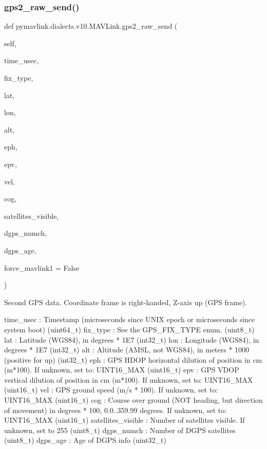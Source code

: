 \begin{DoxyVerb}
\begin{DoxyVerb}
\subsubsection{\texorpdfstring{gps2\+\_\+raw\+\_\+send()}{gps2\_raw\_send()}}
{\footnotesize\ttfamily def pymavlink.\+dialects.\+v10.\+M\+A\+V\+Link.\+gps2\+\_\+raw\+\_\+send (\begin{DoxyParamCaption}\item[{}]{self,  }\item[{}]{time\+\_\+usec,  }\item[{}]{fix\+\_\+type,  }\item[{}]{lat,  }\item[{}]{lon,  }\item[{}]{alt,  }\item[{}]{eph,  }\item[{}]{epv,  }\item[{}]{vel,  }\item[{}]{cog,  }\item[{}]{satellites\+\_\+visible,  }\item[{}]{dgps\+\_\+numch,  }\item[{}]{dgps\+\_\+age,  }\item[{}]{force\+\_\+mavlink1 = {\ttfamily False} }\end{DoxyParamCaption})}

\begin{DoxyVerb}Second GPS data. Coordinate frame is right-handed, Z-axis up (GPS
frame).

time_usec                 : Timestamp (microseconds since UNIX epoch or microseconds since system boot) (uint64_t)
fix_type                  : See the GPS_FIX_TYPE enum. (uint8_t)
lat                       : Latitude (WGS84), in degrees * 1E7 (int32_t)
lon                       : Longitude (WGS84), in degrees * 1E7 (int32_t)
alt                       : Altitude (AMSL, not WGS84), in meters * 1000 (positive for up) (int32_t)
eph                       : GPS HDOP horizontal dilution of position in cm (m*100). If unknown, set to: UINT16_MAX (uint16_t)
epv                       : GPS VDOP vertical dilution of position in cm (m*100). If unknown, set to: UINT16_MAX (uint16_t)
vel                       : GPS ground speed (m/s * 100). If unknown, set to: UINT16_MAX (uint16_t)
cog                       : Course over ground (NOT heading, but direction of movement) in degrees * 100, 0.0..359.99 degrees. If unknown, set to: UINT16_MAX (uint16_t)
satellites_visible        : Number of satellites visible. If unknown, set to 255 (uint8_t)
dgps_numch                : Number of DGPS satellites (uint8_t)
dgps_age                  : Age of DGPS info (uint32_t)\end{DoxyVerb}
 \mbox{\label{classpymavlink_1_1dialects_1_1v10_1_1MAVLink_a65d56c9b25cfb3c79a4dac1f88e18be7}} 

\end{DoxyVerb}
\end{DoxyVerb}
